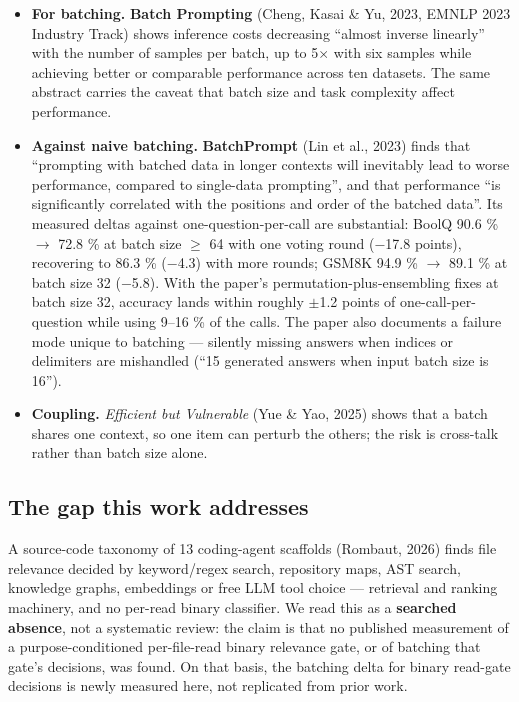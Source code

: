 \documentclass[10pt]{article}
\begin{document}
\begin{itemize}
\item \textbf{For batching.} \textbf{Batch Prompting} (Cheng, Kasai \& Yu, 2023, EMNLP 2023 Industry Track)\cite{ref3} shows inference costs decreasing ``almost inverse linearly'' with the number of samples per batch, up to 5$\times$ with six samples while achieving better or comparable performance across ten datasets. The same abstract carries the caveat that batch size and task complexity affect performance.
\item \textbf{Against naive batching.} \textbf{BatchPrompt} (Lin et al., 2023)\cite{ref6} finds that ``prompting with batched data in longer contexts will inevitably lead to worse performance, compared to single-data prompting'', and that performance ``is significantly correlated with the positions and order of the batched data''. Its measured deltas against one-question-per-call are substantial: BoolQ 90.6 \% $\to$ 72.8 \% at batch size $\ge$ 64 with one voting round ($-$17.8 points), recovering to 86.3 \% ($-$4.3) with more rounds; GSM8K 94.9 \% $\to$ 89.1 \% at batch size 32 ($-$5.8). With the paper's permutation-plus-ensembling fixes at batch size 32, accuracy lands within roughly $\pm$1.2 points of one-call-per-question while using 9--16 \% of the calls. The paper also documents a failure mode unique to batching --- silently missing answers when indices or delimiters are mishandled (``15 generated answers when input batch size is 16'').
\item \textbf{Coupling.} \emph{Efficient but Vulnerable} (Yue \& Yao, 2025)\cite{ref13} shows that a batch shares one context, so one item can perturb the others; the risk is cross-talk rather than batch size alone.
\end{itemize}

\subsection{The gap this work addresses}

A source-code taxonomy of 13 coding-agent scaffolds (Rombaut, 2026)\cite{ref10} finds file relevance decided by keyword/regex search, repository maps, AST search, knowledge graphs, embeddings or free LLM tool choice --- retrieval and ranking machinery, and no per-read binary classifier. We read this as a \textbf{searched absence}, not a systematic review: the claim is that no published measurement of a purpose-conditioned per-file-read binary relevance gate, or of batching that gate's decisions, was found. On that basis, the batching delta for binary read-gate decisions is newly measured here, not replicated from prior work.
\end{document}
